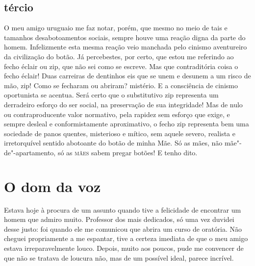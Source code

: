 \section*{tércio}

O meu amigo uruguaio me faz notar, porém, que mesmo no meio de tais e
tamanhos desabotoamentos sociais, sempre houve uma reação digna da parte
do homem. Infelizmente esta mesma reação veio manchada pelo cinismo
aventureiro da civilização do botão. Já percebestes, por certo, que
estou me referindo ao fecho éclair ou zip, que não sei como se escreve.
Mas que contraditória coisa o fecho éclair! Duas carreiras de dentinhos
eis que se unem e desunem a um risco de mão, zip! Como se fecharam ou
abriram? mistério. E a consciência de cinismo oportunista se acentua.
Será certo que o substitutivo zip representa um derradeiro esforço do
ser social, na preservação de sua integridade! Mas de nulo ou
contraproducente valor normativo, pela rapidez sem esforço que exige, e
sempre desleal e conformistamente aproximativo, o fecho zip representa
bem uma sociedade de panos quentes, misterioso e mítico, sem aquele
severo, realista e irretorquível sentido abotoante do botão de minha
Mãe. Só as mães, não mãe"-de"-apartamento, só as \textsc{mães} sabem pregar botões!
E tenho dito.

\chapter{O dom da voz}

Estava hoje à procura de um assunto quando tive a felicidade de
encontrar um homem que admiro muito. Professor dos mais dedicados, só
uma vez duvidei desse justo: foi quando ele me comunicou que abrira um
curso de oratória. Não cheguei propriamente a me espantar, tive a
certeza imediata de que o meu amigo estava irreparavelmente louco.
Depois, muito aos poucos, pude me convencer de que não se tratava de
loucura não, mas de um possível ideal, parece incrível.

